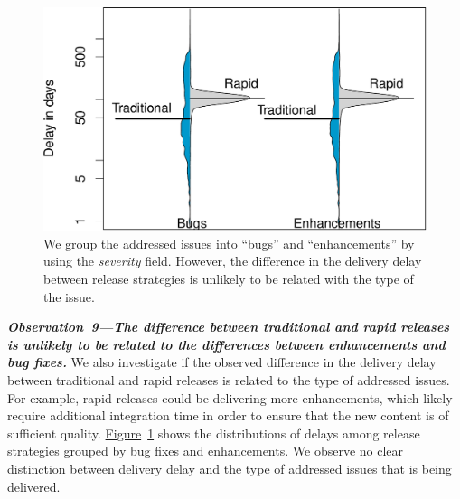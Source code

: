 \begin{figure}[!]
	\centering
	\includegraphics[width=\columnwidth,keepaspectratio]
	{chapters/chapter5/figures/discussion/bugs_vs_enhancements.pdf}
	\caption{We group the addressed issues into ``bugs'' and
	``enhancements'' by using the \textit{severity} field.  However, the
difference in the delivery delay between release strategies is unlikely to be
related with the type of the issue.}
	\label{fig:bugs_vs_enhancements}
\end{figure}

\noindent\textit{\textbf{Observation~9---The difference between traditional and rapid releases
is unlikely to be related to the differences between enhancements and bug
fixes.}}
We also investigate if the observed difference in the delivery delay between
traditional and rapid releases is related to the type of addressed issues. For
example, rapid releases could be delivering more enhancements, which likely
require additional integration time in order to ensure that the new content is
of sufficient quality.
\hyperref[fig:bugs_vs_enhancements]{Figure}~\ref{fig:bugs_vs_enhancements} shows
the distributions of delays among release strategies grouped by bug fixes and
enhancements. We observe no clear distinction between delivery delay and the
type of addressed issues that is being delivered.

